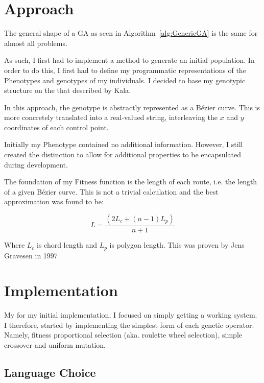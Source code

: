 
\section{Approach}

The general shape of a GA as seen in Algorithm~\ref{alg:GenericGA} is the same for almost all problems. 

As such, I first had to implement a method to generate an initial population. In order to do this, I first had to define my programmatic representations of the Phenotypes and genotypes of my individuals. I decided to base my genotypic structure on the that described by Kala\cite{kalaOnroadIntelligentVehicles2016}. 

In this approach, the genotype is abstractly represented as a Bézier curve. This is more concretely translated into a real-valued string, interleaving the $x$ and $y$ coordinates of each control point.

Initially my Phenotype contained no additional information. However, I still created the distinction to allow for additional properties to be encapsulated during development.

 The foundation of my Fitness function is the length of each route, i.e. the length of a given Bézier curve. This is not a trivial calculation and the best approximation was found to be:

\begin{equation}
    L = \frac{(2L_c + (n-1)L_p)}{n+1}
\end{equation}

Where $L_c$ is chord length and $L_p$ is polygon length. This was proven by Jens Gravesen\cite{gravesenAdaptiveSubdivisionLength1997} in 1997

\section{Implementation}

My for my initial implementation, I focused on simply getting a working system. I therefore, started by implementing the simplest form of each genetic operator. Namely, fitness proportional selection (aka. roulette wheel selection), simple crossover and uniform mutation. 

\subsection{Language Choice}

